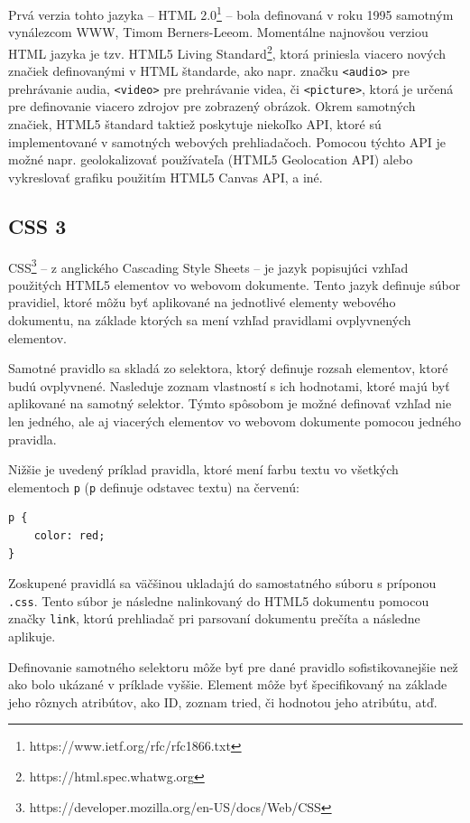 Prvá verzia tohto jazyka -- HTML 2.0\footnote{https://www.ietf.org/rfc/rfc1866.txt} -- bola definovaná v roku 1995 samotným vynálezcom WWW, Timom Berners-Leeom. Momentálne najnovšou verziou HTML jazyka je tzv. HTML5 Living Standard\footnote{https://html.spec.whatwg.org}, ktorá priniesla viacero nových značiek definovanými v HTML štandarde, ako napr. značku \texttt{<audio>} pre prehrávanie audia, \texttt{<video>} pre prehrávanie videa, či \texttt{<picture>}, ktorá je určená pre definovanie viacero zdrojov pre zobrazený obrázok. Okrem samotných značiek, HTML5 štandard taktiež poskytuje niekoľko API, ktoré sú implementované v samotných webových prehliadačoch. Pomocou týchto API je možné napr. geolokalizovať používateľa (HTML5 Geolocation API) alebo vykreslovať grafiku použitím HTML5 Canvas API, a iné.

\subsection {CSS 3}
CSS\footnote{https://developer.mozilla.org/en-US/docs/Web/CSS} -- z anglického Cascading Style Sheets -- je jazyk popisujúci vzhľad použitých HTML5 elementov vo webovom dokumente. Tento jazyk definuje súbor pravidiel, ktoré môžu byť aplikované na jednotlivé elementy webového dokumentu, na základe ktorých sa mení vzhľad pravidlami ovplyvnených elementov.

Samotné pravidlo sa skladá zo selektora, ktorý definuje rozsah elementov, ktoré budú ovplyvnené. Nasleduje zoznam vlastností s ich hodnotami, ktoré majú byť aplikované na samotný selektor. Týmto spôsobom je možné definovať vzhľad nie len jedného, ale aj viacerých elementov vo webovom dokumente pomocou jedného pravidla.

Nižšie je uvedený príklad pravidla, ktoré mení farbu textu vo všetkých elementoch \texttt{p} (\texttt{p} definuje odstavec textu) na červenú:

\begin{lstlisting}
p {
    color: red;
}
\end{lstlisting}

Zoskupené pravidlá sa väčšinou ukladajú do samostatného súboru s príponou \texttt{.css}. Tento súbor je následne nalinkovaný do HTML5 dokumentu pomocou značky \texttt{link}, ktorú prehliadač pri parsovaní dokumentu prečíta a následne aplikuje.

Definovanie samotného selektoru môže byť pre dané pravidlo sofistikovanejšie než ako bolo ukázané v príklade vyššie. Element môže byť špecifikovaný na základe jeho rôznych atribútov, ako ID, zoznam tried, či hodnotou jeho atribútu, atď.


